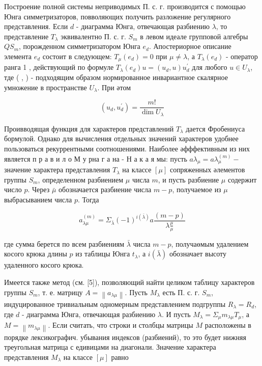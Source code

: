 \documentclass[10pt]{article}
\begin{document}
Построение полной системы неприводимых П. с. г. производится с помощью Юнга симметризаторов, повволяющих получить разложение регулярного представления. Если $d$ - диаграмма Юнга, отвечающая разбиению $\lambda$, то представление $T_{\lambda}$ эквивалентно П. с. г. $S_{m}$ в левом идеале групповой алгебры $Q S_{m}$, порожденном симметризатором Юнга $e_{d}$. Апостериорное описание элемента $e_{d}$ состоит в следующем: $T_{\mu}\left(e_{d}\right)=0$ при $\mu \neq \lambda$, а $T_{\lambda}\left(e_{d}\right)$ - оператор ранга 1 , действующий по формуле $T_{\lambda}\left(e_{d}\right) u=\left(u_{d}, u\right) u_{d}^{\prime}$ для любого $u \in U_{\lambda}$, тде ( , ) - подходящим образом нормированное инвариантное скалярное умножение в пространстве $U_{\lambda}$. При әтом



\[

\left(u_{d}, u_{d}^{\prime}\right)=\frac{m !}{\operatorname{dim} U_{\lambda}}

\]



Проивводящая функция для характеров представлений $T_{\lambda}$ дается Фробениуса бормулой. Однако для вычисления отдельных значений характеров удобнее пользоваться рекуррентными соотношениями. Наиболее әфффективным из них является п р а в и л о М у рна г а на - Н а к а я мы: пусть $a \lambda_{\mu}=a \lambda_{\mu}^{(m)}-$ значение характера представления $T_{\lambda}$ на классе $[\mu]$ сопряженных әлементов группы $S_{m}$, определенном разбиением $\mu$ числа $m$, и пусть разбиение $\mu$ содержит число $p$. Через $\bar{\mu}$ обозначается разбиение числа $m-p$, получаемое из $\mu$ выбрасыванием числа $p$. Тогда



\[

a_{\lambda \mu}^{(m)}=\Sigma_{\bar{\lambda}}(-1)^{i(\bar{\lambda})} a \frac{(m-p)}{\lambda \frac{\mu}{\mu}}

\]



где сумма берется по всем разбиениям $\bar{\lambda}$ числа $m-p$, получаөмым удалением косого крюка длины $p$ из таблицы Юнга $t_{\lambda}$, а $i(\bar{\lambda})$ обозначает высоту удаленного косого крюка.



Имеется также метод (см. [5]), позволяющий найти целиком таблицу характеров группы $S_{m}$, т. е. матрицу $A=\left\|a_{\lambda \mu}\right\|$. Пусть $M_{\lambda}$ есть П. с. г. $S_{m}$, индуцированное тривиальным одномерным представлением подгруппы $R_{\lambda}=R_{d}$, где $d$ - диаграмма Юнга, отвечающая разбиению $\lambda$. И пусть $M_{\lambda}=\Sigma_{\mu} m_{\lambda \mu} T_{\mu}$, а $M=\left\|m_{\lambda \mu}\right\|$. Если считать, что строки и столбцы матрицы $M$ расположены в порядке лексикографич. убывания индексов (разбиений), то это будет нижняя треугольная матрица с едивицами на диагонали. Значение характера представления $M_{\lambda}$ на классе $[\mu]$ равно
\end{document}
